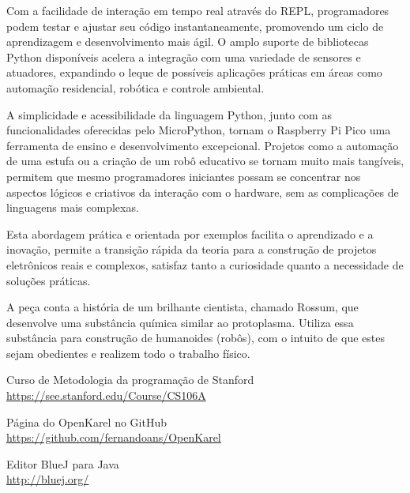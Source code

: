 \documentclass[a4paper,11pt]{article}
\begin{document}
Com a facilidade de interação em tempo real através do REPL, programadores podem testar e ajustar seu código instantaneamente, promovendo um ciclo de aprendizagem e desenvolvimento mais ágil. O amplo suporte de bibliotecas Python disponíveis acelera a integração com uma variedade de sensores e atuadores, expandindo o leque de possíveis aplicações práticas em áreas como automação residencial, robótica e controle ambiental.

A simplicidade e acessibilidade da linguagem Python, junto com as funcionalidades oferecidas pelo MicroPython, tornam o Raspberry Pi Pico uma ferramenta de ensino e desenvolvimento excepcional. Projetos como a automação de uma estufa ou a criação de um robô educativo se tornam muito mais tangíveis, permitem que mesmo programadores iniciantes possam se concentrar nos aspectos lógicos e criativos da interação com o hardware, sem as complicações de linguagens mais complexas. 

Esta abordagem prática e orientada por exemplos facilita o aprendizado e a inovação, permite a transição rápida da teoria para a construção de projetos eletrônicos reais e complexos, satisfaz tanto a curiosidade quanto a necessidade de soluções práticas.



\begin{thebibliography}{7}
  A peça conta a história de um brilhante cientista, chamado Rossum, que desenvolve uma substância química similar ao protoplasma. Utiliza essa substância para construção de humanoides (robôs), com o intuito de que estes sejam obedientes e realizem todo o trabalho físico.

  Curso de Metodologia da programação de Stanford \\
  \url{https://see.stanford.edu/Course/CS106A}
  
  Página do OpenKarel no GitHub \\
  \url{https://github.com/fernandoans/OpenKarel}
  
  Editor BlueJ para Java \\
  \url{http://bluej.org/}

  
\end{thebibliography}
  
\end{document}
